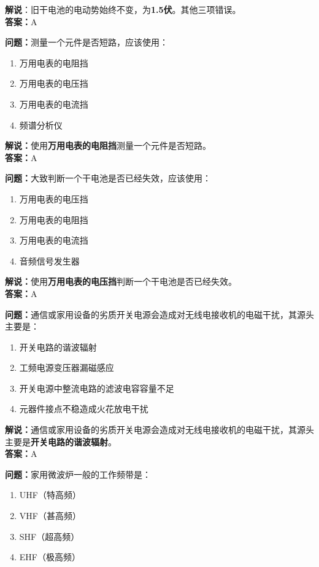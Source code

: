 \textbf{解说}：旧干电池的电动势始终不变，为\textbf{1.5伏}。其他三项错误。\\\textbf{答案：}A%


\textbf{问题：}测量一个元件是否短路，应该使用：

\begin{enumerate}[label=\Alph*), leftmargin=1cm]
	\item 万用电表的电阻挡
	\item 万用电表的电压挡
	\item 万用电表的电流挡
	\item 频谱分析仪
\end{enumerate}

\textbf{解说：}使用\textbf{万用电表的电阻挡}测量一个元件是否短路。\\\textbf{答案：}A%


\textbf{问题：}大致判断一个干电池是否已经失效，应该使用：

\begin{enumerate}[label=\Alph*), leftmargin=1cm]
	\item 万用电表的电压挡
	\item 万用电表的电阻挡
	\item 万用电表的电流挡
	\item 音频信号发生器
\end{enumerate}

\textbf{解说：}使用\textbf{万用电表的电压挡}判断一个干电池是否已经失效。\\\textbf{答案：}A%


\textbf{问题：}通信或家用设备的劣质开关电源会造成对无线电接收机的电磁干扰，其源头主要是：

\begin{enumerate}[label=\Alph*), leftmargin=1cm]
	\item 开关电路的谐波辐射
	\item 工频电源变压器漏磁感应
	\item 开关电源中整流电路的滤波电容容量不足
	\item 元器件接点不稳造成火花放电干扰
\end{enumerate}

\textbf{解说：}通信或家用设备的劣质开关电源会造成对无线电接收机的电磁干扰，其源头主要是\textbf{开关电路的谐波辐射}。\\\textbf{答案：}A%


\textbf{问题：}家用微波炉一般的工作频带是：

\begin{enumerate}[label=\Alph*), leftmargin=1cm]
	\item UHF（特高频）
	\item VHF（甚高频）
	\item SHF（超高频）
	\item EHF（极高频）
\end{enumerate}


